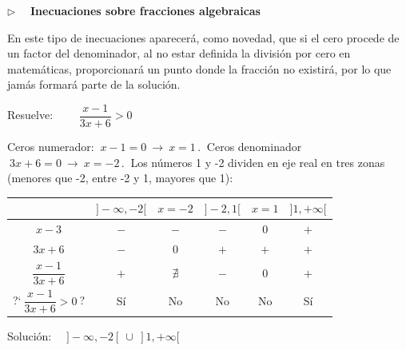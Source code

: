 \vspace{5mm}
\begin{large}
$\triangleright \quad $ \textbf{Inecuaciones sobre fracciones algebraicas}	
\end{large}
\vspace{5mm}

En este tipo de inecuaciones aparecerá, como novedad, que si el cero procede de un factor del denominador, al no estar definida la división por cero en matemáticas, proporcionará un punto donde la fracción no existirá, por lo que jamás formará parte de la solución.


\begin{miejemplo}

Resuelve: $\qquad \dfrac{x-1}{3x+6}>0$	

\vspace{5mm} Ceros numerador: $\ x-1=0 \ \to \ x=1\, . \ $ Ceros denominador $\ 3x+6=0 \ \to \ x=-2 \, . \ $ Los números 1 y -2 dividen en eje real en tres zonas (menores que -2, entre -2 y 1, mayores que 1):

\begin{table}[H]
\centering
\begin{tabular}{c|c|c|c|c|c|}
 & $]-\infty,-2[$ & $x=-2$ & $]-2,1[$ & $x=1$ & $]1,+\infty[$ \\ \hline
$x-3$ & $-$ & $-$ & $-$ & $0$ & $+$ \\ \hline
$3x+6$ & $-$ & $0$ &$+$  & $+$ & $+$ \\ \hline
$\dfrac{x-1}{3x+6}$ &$+$  & $\nexists$ & $-$ & $0$ & $+$ \\ \hline
?`$\ \dfrac{x-1}{3x+6}>0\ $? & Sí & No & No & No & Sí \\ \hline
\end{tabular}
\end{table}

Solución: $\quad ]-\infty,-2[ \ \cup \ ]1,+\infty[$

\end{miejemplo}

